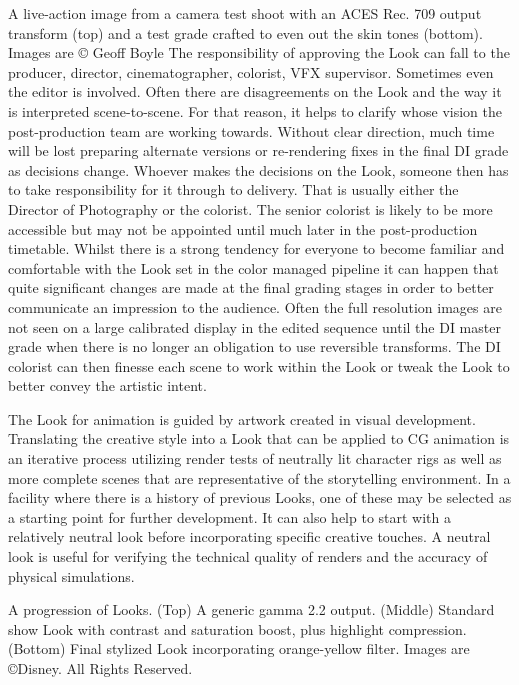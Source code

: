  A live-action image from a camera test shoot with an ACES Rec. 709 output transform (top) and a test grade crafted to even out the skin tones (bottom). 
Images are © Geoff Boyle
The responsibility of approving the Look can fall to the producer, director, cinematographer, colorist, VFX supervisor. Sometimes even the editor is involved. Often there are disagreements on the Look and the way it is interpreted scene-to-scene. For that reason, it helps to clarify whose vision the post-production team are working towards. Without clear direction, much time will be lost preparing alternate versions or re-rendering fixes in the final DI grade as decisions change. Whoever makes the decisions on the Look, someone then has to take responsibility for it through to delivery. That is usually either the Director of Photography or the colorist. The senior colorist is likely to be more accessible but may not be appointed until much later in the post-production timetable. Whilst there is a strong tendency for everyone to become familiar and comfortable with the Look set in the color managed pipeline it can happen that quite significant changes are made at the final grading stages in order to better communicate an impression to the audience.  Often the full resolution images are not seen on a large calibrated display in the edited sequence until the DI master grade when there is no longer an obligation to use reversible transforms. The DI colorist  can then finesse each scene to work within the Look or tweak the Look to better convey the artistic intent.

The Look for animation is guided by artwork created in visual development. Translating the creative style into a Look that can be applied to CG animation is an iterative process utilizing render tests of neutrally lit character rigs as well as more complete scenes that are representative of the storytelling environment. In a facility where there is a history of previous Looks, one of these may be selected as a starting point for further development. It can also help to start with a relatively neutral look before incorporating specific creative touches. A neutral look is useful for verifying the technical quality of renders and the accuracy of physical simulations.




A progression of Looks. (Top) A generic gamma 2.2 output. (Middle) Standard show Look with contrast and saturation boost, plus highlight compression. (Bottom) Final stylized Look incorporating orange-yellow filter. 
 Images are ©Disney. All Rights Reserved.

